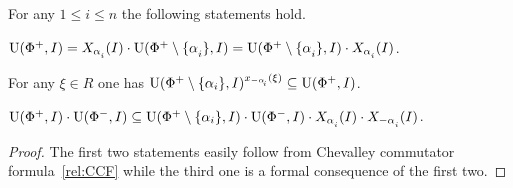 \begin{lemma}\label{lemma:dv_unipotent} For any $1\leq i\leq n$ the following statements hold. 
\begin{thmlist} \item \label{item-dvu1} $\U(\Phi^+, I) = X_{\alpha\ssub{i}}(I)\cdot \U(\Phi^+\setminus\{\alpha\ssub{i}\}, I) = \U(\Phi^+\setminus\{\alpha\ssub{i}\}, I)\cdot X_{\alpha\ssub{i}}(I)$.
\item \label{item-dvu2} For any $\xi\in R$ one has $\U(\Phi^+\setminus\{\alpha_i\}, I)^{x_{-\alpha\ssub{i}}(\xi)} \subseteq \U(\Phi^+, I)$.
\item \label{item-dvu3} $\U(\Phi^+, I)\cdot \U(\Phi^-, I) \subseteq \U(\Phi^+\setminus \{\alpha_i\}, I) \cdot \U(\Phi^-, I) \cdot X_{\alpha\ssub{i}}(I) \cdot X_{-\alpha\ssub{i}}(I)$.
\end{thmlist} \end{lemma}
\begin{proof} The first two statements easily follow from Chevalley commutator formula~\ref{rel:CCF} while the third one is a formal consequence of the first two. \end{proof}



